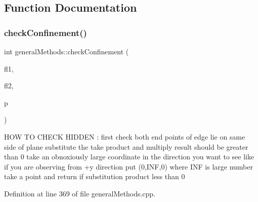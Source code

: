 \subsection{Function Documentation}
\mbox{\label{namespacegeneral_methods_a2bb810600ec90ec064ea8496ee0ab862}} 
\subsubsection{\texorpdfstring{check\+Confinement()}{checkConfinement()}}
{\footnotesize\ttfamily int general\+Methods\+::check\+Confinement (\begin{DoxyParamCaption}\item[{\mbox{\hyperlink{classbasic_loop_edge_set}{basic\+Loop\+Edge\+Set}}}]{fl1,  }\item[{\mbox{\hyperlink{classbasic_loop_edge_set}{basic\+Loop\+Edge\+Set}}}]{fl2,  }\item[{\mbox{\hyperlink{structplane}{plane}}}]{p }\end{DoxyParamCaption})}

H\+OW TO C\+H\+E\+CK H\+I\+D\+D\+EN \+: first check both end points of edge lie on same side of plane substitute the take product and multiply result should be greater than 0 take an obnoxiously large coordinate in the direction you want to see like if you are observing from +y direction put (0,I\+NF,0) where I\+NF is large number take a point and return if substitution product less than 0 

Definition at line 369 of file general\+Methods.\+cpp.

